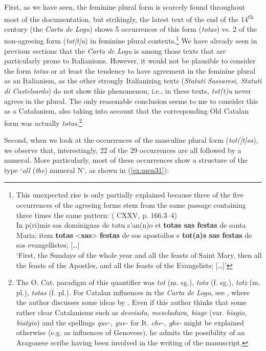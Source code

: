 \documentclass[output=paper,colorlinks,citecolor=brown]{langscibook}
\begin{document}
First, as we have seen, the feminine plural form is scarcely found throughout most of the documentation, but strikingly, the latest text of the end of the 14\textsuperscript{th} century (the \textit{Carta de Logu}) shows 5 occurrences of this form (\textit{totas}) vs. 2 of the non-agreeing form (\textit{tot[t]u}) in feminine plural contexts.\footnote{This unexpected rise is only partially explained because three of the five occurrences of the agreeing forms stem from the same passage containing three times the same pattern:
\ea ( CXXV, p. 166.3--4)\\
In p(ri)mis sas dominiguas de totu s'an(n)o et \textbf{totas sas festas} de santa Maria; item \textbf{totas} <\textbf{sas}> \textbf{festas} de sos apostollos e \textbf{tot(a)s sas festas} de sos evangellistes; […]\\
    ‘First, the Sundays of the whole year and all the feasts of Saint Mary, then all the feasts of the Apostles, and all the feasts of the Evangelists; […]’
\z} We have already seen in previous sections that the \textit{Carta de Logu} is among those texts that are particularly prone to Italianisms. However, it would not be plausible to consider the form \textit{totas} or at least the tendency to have agreement in the feminine plural as an Italianism, as the other strongly Italianizing texts (\textit{Statuti Sassaresi, Statuti di Castelsardo}) do not show this phenomenon, i.e., in these texts, \textit{tot(t)u} never agrees in the plural. The only reasonable conclusion seems to me to consider this as a Catalanism, also taking into account that the corresponding Old Catalan form was actually \textit{totas}.\footnote{The O. Cat. paradigm of this quantifier was \textit{tot} (m. sg.), \textit{tota} (f. sg.), \textit{totz} (m. pl.), \textit{totas} (f. pl.). For Catalan influences in the \textit{Carta de Logu}, see \citet[][180-181]{LoiCorvetto1992}, where the author discusses some ideas by \citet[][136]{Sanna1975}. Even if this author thinks that some rather clear Catalanisms such as \textit{desviadu, mescladura, biage} (var. \textit{biagio, biatgio}) and the spellings \textit{que-, gue-} for It. \textit{che-, ghe-} might be explained otherwise (e.g. as influences of Genovese), he admits the possibility of an Aragonese scribe having been involved in the writing of the manuscript.}\largerpage[2]

\begin{sloppypar}
Second, when we look at the occurrences of the masculine plural form (\textit{tot([t]os}), we observe that, interestingly, 22 of the 29 occurrences are all followed by a numeral. More particularly, most of these occurrences show a structure of the type ‘\textit{all} (\textit{the}) numeral N’, as shown in (\ref{ex:men31}):
\end{sloppypar}
\end{document}
